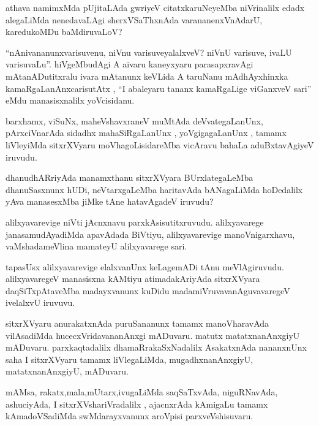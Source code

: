 \documentclass{article}
\begin{document}
\begin{mn}
athava namimxMda  pUjitaLAda gwriyeV citatxkaruNeyeMba niVrinalilx edadx alegaLiMda nenedavaLAgi
sherxVSaThxnAda varananenxVnAdarU, karedukoMDu baMdiruvaLoV?
\end{mn}

\begin{mn}
``nAnivananunxvarisuvenu, niVnu varisuveyalalxveV? niVnU varisuve, ivaLU varisuvaLu''. 
hiVgeMbudAgi A aivaru kaneyxyaru parasapxravAgi mAtanADutitxralu ivara mAtanunx keVLida
A taruNanu mAdhAyxhinxka kamaRgaLanAnxcarisutAtx , ``I  abaleyaru tananx kamaRgaLige viGanxveV 
sari'' eMdu manasisxnalilx yoVcisidanu.
\end{mn}

\begin{mn}
barxhamx, viSuNx, maheVshavxraneV muMtAda deVvategaLanUnx, pArxciVnarAda sidadhx mahaSiRgaLanUnx 
, yoVgigagaLanUnx , tamamx liVleyiMda sitxrXVyaru moVhagoLisidareMba vicAravu bahaLa 
aduBxtavAgiyeV iruvudu.
\end{mn}

\begin{mn}
dhanudhARriyAda manamxthanu sitxrXVyara BUrxlategaLeMba dhanuSasxnunx hUDi, neVtarxgaLeMba 
haritavAda bANagaLiMda hoDedalilx yAva manasesxMba jiMke tAne hatavAgadeV iruvudu?
\end{mn}

\begin{mn}
alilxyavarevige niVti jAcnxnavu parxkAsisutitxruvudu. alilxyavarege janasamudAyadiMda apavAdada 
BiVtiyu, alilxyavarevige manoVnigarxhavu, vaMshadameVlina mamateyU alilxyavarege sari. 
\end{mn}

\begin{mn}
tapasUsx alilxyavarevige elalxvanUnx keLagemADi tAnu meVlAgiruvudu. alilxyavaregeV manasisxna 
kAMtiyu atimadakAriyAda sitxrXVyara daqSiTxpAtaveMba madayxvanunx kuDidu 
madamiVruvavanAguvavaregeV ivelalxvU iruvuvu.
\end{mn}

\begin{mn}
sitxrXVyaru anurakatxnAda puruSananunx tamamx manoVharavAda vilAsadiMda hucecxVridavananAnxgi 
mADuvaru. matutx matatxnanAnxgiyU mADuvaru. parxkaqtadalilx dhamaRrakaSxNadalilx AsakatxnAda 
nananxnUnx saha I sitxrXVyaru tamamx liVlegaLiMda, mugadhxnanAnxgiyU, matatxnanAnxgiyU, mADuvaru. 
\end{mn}

\begin{mn}
mAMsa, rakatx,mala,mUtarx,ivugaLiMda saqSaTxvAda, niguRNavAda, ashuciyAda, I sitxrXVshariVradalilx ,
ajacnxrAda kAmigaLu tamamx kAmadoVSadiMda swMdarayxvanunx aroVpisi parxveVshisuvaru.
\end{mn}
\end{document}
